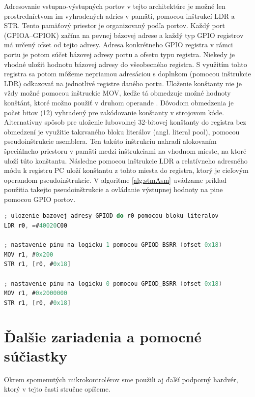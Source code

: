 Adresovanie vstupno-výstupných portov v tejto architektúre je možné len prostredníctvom im vyhradených adries v pamäti, pomocou inštrukcí LDR a STR. Tento pamäťový priestor je organizovaný podľa portov. Každý port (GPIOA--GPIOK) začína na pevnej bázovej adrese a každý typ GPIO registrov má určený ofset od tejto adresy. Adresa konkrétneho GPIO registra v rámci portu je potom súčet bázovej adresy portu a ofsetu typu registra. Niekedy je vhodné uložiť hodnotu bázovej adresy do všeobecného registra. S využitím tohto registra sa potom môžeme nepriamou adresáciou s doplnkom (pomocou inštrukcie LDR) odkazovať na jednotlivé registre daného portu. Uloženie konštanty nie je vždy možné pomocou inštruckie MOV, keďže tá obmedzuje možné hodnoty konštánt, ktoré možno použiť v druhom operande \cite{stmInstruction}. Dôvodom obmedzenia je počet bitov (12) vyhradený pre zakódovanie konštanty v strojovom kóde. Alternatívny spôsob pre uloženie ľubovolnej 32-bitovej konštanty do registra bez obmedzení je využitie takzvaného bloku literálov (angl. literal pool), pomocou pseudoinštrukcie asemblera. Ten takúto inštrukciu nahradí alokovaním špeciálneho priestoru v pamäti medzi inštrukciami na vhodnom mieste, na ktoré uloží túto konštantu. Následne pomocou inštrukcie LDR a relatívneho adresného módu k registru PC uloží konštantu z tohto miesta do registra, ktorý je cieľovým operandom pseudoinštrukcie. V algoritme \ref{alg:stmAsm} uvádzame príklad použitia takejto pseudoinštrukcie a ovládanie výstupnej hodnoty na pine pomocou GPIO portov.

\begin{lstlisting}[float,language=C,caption={Nastavenie hodnoty výstupneho pinu GPIOD 9 na STM32F4 v jazyku asembler. Pre uloženie bázovej adresy portu GPIOD použijeme blok literálov.}, label=alg:stmAsm]
; ulozenie bazovej adresy GPIOD do r0 pomocou bloku literalov
LDR r0, =#40020C00

; nastavenie pinu na logicku 1 pomocou GPIOD_BSRR (ofset 0x18)
MOV r1, #0x200 
STR r1, [r0, #0x18] 

; nastavenie pinu na logicku 0 pomocou GPIOD_BSRR (ofset 0x18)
MOV r1, #0x2000000
STR r1, [r0, #0x18]
\end{lstlisting}

\section{Ďalšie zariadenia a pomocné súčiastky}
Okrem spomenutých mikrokontrolérov sme použili aj ďalší podporný hardvér, ktorý v tejto časti stručne opíšeme.

